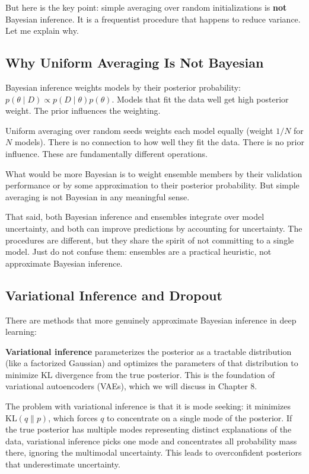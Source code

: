 But here is the key point: simple averaging over random initializations is \textbf{not} Bayesian inference. It is a frequentist procedure that happens to reduce variance. Let me explain why.

\subsection{Why Uniform Averaging Is Not Bayesian}

Bayesian inference weights models by their posterior probability: $p(\theta \mid D) \propto p(D \mid \theta) p(\theta)$. Models that fit the data well get high posterior weight. The prior influences the weighting.

Uniform averaging over random seeds weights each model equally (weight $1/N$ for $N$ models). There is no connection to how well they fit the data. There is no prior influence. These are fundamentally different operations.

What would be more Bayesian is to weight ensemble members by their validation performance or by some approximation to their posterior probability. But simple averaging is not Bayesian in any meaningful sense.

That said, both Bayesian inference and ensembles integrate over model uncertainty, and both can improve predictions by accounting for uncertainty. The procedures are different, but they share the spirit of not committing to a single model. Just do not confuse them: ensembles are a practical heuristic, not approximate Bayesian inference.

\subsection{Variational Inference and Dropout}

There are methods that more genuinely approximate Bayesian inference in deep learning:

\textbf{Variational inference} parameterizes the posterior as a tractable distribution (like a factorized Gaussian) and optimizes the parameters of that distribution to minimize KL divergence from the true posterior. This is the foundation of variational autoencoders (VAEs), which we will discuss in Chapter 8.

The problem with variational inference is that it is mode seeking: it minimizes $\text{KL}(q \| p)$, which forces $q$ to concentrate on a single mode of the posterior. If the true posterior has multiple modes representing distinct explanations of the data, variational inference picks one mode and concentrates all probability mass there, ignoring the multimodal uncertainty. This leads to overconfident posteriors that underestimate uncertainty.

